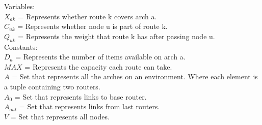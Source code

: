     Variables: \\
$X_{ak} $ = Represents whether route k covers arch a. \\
$C_{uk} $ = Represents whether node u is part of route k. \\
$Q_{uk} $ = Represents the weight that route k has after passing node u. \\


Constants: \\
$D_a $ = Represents the number of items available on arch a. \\
$MAX$ = Represents the capacity each route can take. \\
$A$ = Set that represents all the arches on an environment. Where each element is a tuple containing two routers. \\
$A_0$ = Set that represents links to base router. \\
$A_{out}$ = Set that represents links from last routers. \\
$V$ = Set that represents all nodes. \\